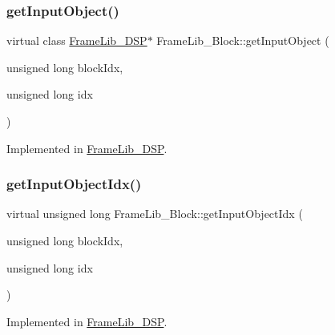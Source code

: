 \subsubsection{\texorpdfstring{get\+Input\+Object()}{getInputObject()}}
{\footnotesize\ttfamily virtual class \hyperlink{class_frame_lib___d_s_p}{Frame\+Lib\+\_\+\+D\+SP}$\ast$ Frame\+Lib\+\_\+\+Block\+::get\+Input\+Object (\begin{DoxyParamCaption}\item[{unsigned long}]{block\+Idx,  }\item[{unsigned long}]{idx }\end{DoxyParamCaption})\hspace{0.3cm}{\ttfamily [pure virtual]}}



Implemented in \hyperlink{class_frame_lib___d_s_p_a11c7de51dabca61ca89e5fc178144725}{Frame\+Lib\+\_\+\+D\+SP}.

\mbox{\label{class_frame_lib___block_a65748f72b840fd90bee87591446b9b50}} 
\subsubsection{\texorpdfstring{get\+Input\+Object\+Idx()}{getInputObjectIdx()}}
{\footnotesize\ttfamily virtual unsigned long Frame\+Lib\+\_\+\+Block\+::get\+Input\+Object\+Idx (\begin{DoxyParamCaption}\item[{unsigned long}]{block\+Idx,  }\item[{unsigned long}]{idx }\end{DoxyParamCaption})\hspace{0.3cm}{\ttfamily [pure virtual]}}



Implemented in \hyperlink{class_frame_lib___d_s_p_a6da5977366587bbab7532a8d4ab7d2f5}{Frame\+Lib\+\_\+\+D\+SP}.

\mbox{\label{class_frame_lib___block_ab16af33ec9eb40711590cb90a927706c}} 
